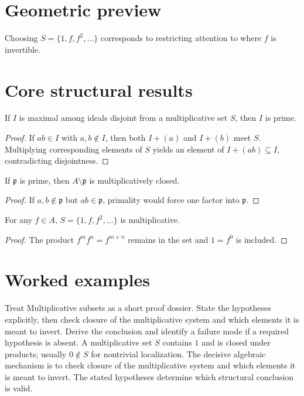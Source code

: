\section{Geometric preview}
Choosing $S=\{1,f,f^2,\dots\}$ corresponds to restricting attention to where $f$ is invertible.

\section{Core structural results}

\begin{theorem}\label{thm:v05-01}
If $I$ is maximal among ideals disjoint from a multiplicative set $S$, then $I$ is prime.
\begin{proof}
If $ab\in I$ with $a,b\notin I$, then both $I+(a)$ and $I+(b)$ meet $S$. Multiplying corresponding elements of $S$ yields an element of $I+(ab)\subseteq I$, contradicting disjointness.
\end{proof}
\end{theorem}

\begin{theorem}\label{thm:v05-02}
If $\mathfrak p$ is prime, then $A\setminus\mathfrak p$ is multiplicatively closed.
\begin{proof}
If $a,b\notin\mathfrak p$ but $ab\in\mathfrak p$, primality would force one factor into $\mathfrak p$.
\end{proof}
\end{theorem}

\begin{theorem}\label{thm:v05-03}
For any $f\in A$, $S=\{1,f,f^2,\dots\}$ is multiplicative.
\begin{proof}
The product $f^m f^n=f^{m+n}$ remains in the set and $1=f^0$ is included.
\end{proof}
\end{theorem}

\section{Worked examples}

\begin{example}\label{ex:v05-worked-01}
Treat Multiplicative subsets as a short proof dossier. State the hypotheses explicitly, then check closure of the multiplicative system and which elements it is meant to invert. Derive the conclusion and identify a failure mode if a required hypothesis is absent. A multiplicative set $S$ contains $1$ and is closed under products; usually $0\notin S$ for nontrivial localization. The decisive algebraic mechanism is to check closure of the multiplicative system and which elements it is meant to invert. The stated hypotheses determine which structural conclusion is valid.
\end{example}

